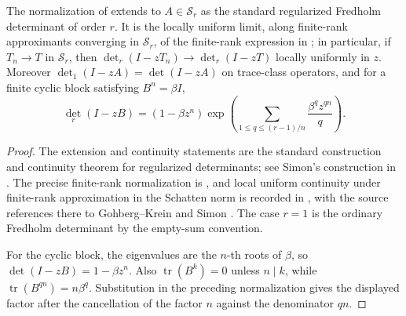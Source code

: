 \begin{lemma}
  \label{lem:regularized-determinant-extension-cyclic-factor}
  The normalization of 
  extends to \(A\in\mathcal S_r\) as the standard regularized Fredholm
  determinant of order \(r\). It is the locally uniform limit, along
  finite-rank approximants converging in \(\mathcal S_r\), of the finite-rank
  expression in ; in
  particular, if \(T_n\to T\) in \(\mathcal S_r\), then
  \(\det_r(I-zT_n)\to\det_r(I-zT)\) locally uniformly in \(z\). Moreover
  \(\det_1(I-zA)=\det(I-zA)\) on trace-class operators, and for a finite
  cyclic block satisfying \(B^n=\beta I\),
  \[
    \det_r(I-zB)
    =(1-\beta z^n)
      \exp\!\left(\sum_{1\le q\le (r-1)/n}
        \frac{\beta^q z^{qn}}{q}\right).
  \]
\end{lemma}

\begin{proof}
  The extension and continuity statements are the standard construction and
  continuity theorem for regularized determinants; see Simon's construction in
  \cite[Chapter~9, Theorems~9.2--9.3]{Simon2005TraceIdeals}. The precise
  finite-rank normalization is
  \cite[eq.~(2.80), pp.~462--463]{GesztesyLatushkinMitreaZinchenko2005}, and
  local uniform continuity under finite-rank approximation in the Schatten
  norm is recorded in
  \cite[Lemma~2.14, eqs.~(2.77)--(2.79), p.~462]{GesztesyLatushkinMitreaZinchenko2005},
  with the source references there to Gohberg--Krein
  \cite[pp.~162--163]{GohbergKrein1969NonSelfAdjoint} and Simon
  \cite[Chapter~9]{Simon2005TraceIdeals}. The case \(r=1\) is the ordinary
  Fredholm determinant by the empty-sum convention.

  For the cyclic block, the eigenvalues are the \(n\)-th roots of \(\beta\),
  so \(\det(I-zB)=1-\beta z^n\). Also
  \(\operatorname{tr}(B^k)=0\) unless \(n\mid k\), while
  \(\operatorname{tr}(B^{qn})=n\beta^q\). Substitution in the preceding
  normalization gives the displayed factor after the cancellation of the
  factor \(n\) against the denominator \(qn\).
\end{proof}

